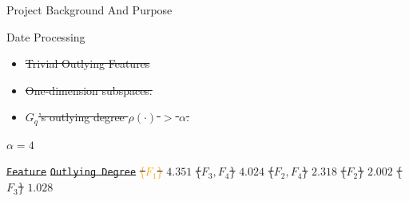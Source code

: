 \documentclass[
 size=14pt,
 paper=smartboard,  %
 mode=present, 		%
 display=slides, 	%
 style=tuliplab,  	%
 pauseslide,
 fleqn,leqno]{powerdot}
\providecommand{\DIFdeltex}[1]{{\protect\color{red}\sout{#1}}}                      %
\providecommand{\DIFdelFL}[1]{\DIFdel{#1}} %
\providecommand{\DIFdel}[1]{\texorpdfstring{\DIFdeltex{#1}}{}} %
\begin{document}
\begin{slide}
\begin{slide}{Project Background And Purpose}
\begin{slide}{Date Processing}
\begin{note}
\begin{itemize}%
\item%
\DIFdel{Trivial Outlying Features
}%

\item%
\DIFdel{One-dimension subspaces.
}%

\item%
\DIFdel{${G_q}$'s outlying degree $\rho(\cdot)$ $>$ $\alpha$.
}
\end{itemize}%
{%
\DIFdelFL{$\alpha = 4$}}

\texttt{\DIFdelFL{Feature}}  %
\texttt{\DIFdelFL{Outlying Degree}}  %
\DIFdelFL{\textcolor{orange}{\{$F_1$\}}}%
\DIFdelFL{$4.351$ }%
\DIFdelFL{\{$F_3, F_4$\}}%
\DIFdelFL{$4.024$ }%
\DIFdelFL{\{$F_2, F_4$\}}%
\DIFdelFL{$2.318$ }%
\DIFdelFL{\{$F_2$\}}%
\DIFdelFL{$2.002$ }%
\DIFdelFL{\{$F_3$\}}%
\DIFdelFL{$1.028$ }%


\end{note}
\end{slide}
\end{slide}
\end{slide}
\end{document}
